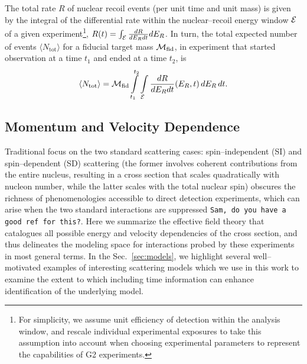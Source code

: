 \documentclass[11pt]{article}
\newcommand{\beq}{\begin{equation}} \newcommand{\eeq}{\end{equation}}
\newcommand{\Sec}[1]{Sec.~\ref{#1}} \newcommand{\Secs}[2]{Secs.~\ref{#1} and \ref{#2}} \newcommand{\Secm}[2]{Secs.~\ref{#1} through \ref{#2}}
\newcommand{\sjwColor}{red}
\newcommand{\sjwtt}[1]{{\color{\sjwColor}\tt #1}}
\begin{document}
The total rate $R$ of nuclear recoil events (per unit time and unit mass) is given by the integral of the differential rate within the nuclear--recoil energy window ${\cal E}$ of a given experiment\footnote{For simplicity, we assume unit efficiency of detection within the analysis window, and rescale individual experimental exposures to take this assumption into account when choosing experimental parameters to represent the capabilities of G2 experiments.}, $R(t)=\int_{\cal E} \frac{dR}{dE_R dt} dE_R$. In turn, the total expected number of events $\langle N_\mathrm{tot}\rangle$ for a fiducial target mass ${\cal M}_\textrm{fid}$, in experiment that started observation at a time $t_1$ and ended at a time $t_2$, is
\beq \label{eq:totevents}
\langle N_\mathrm{tot}\rangle =  \cM_\textrm{fid} \int\limits_{t_1}^{t_2} \int\limits_\cE  \frac{dR}{dE_R dt}(E_R,t)\,dE_R \,dt.
\eeq


\subsection{Momentum and Velocity Dependence}
\label{subsec:momentum_velocity}

Traditional focus on the two standard scattering cases: spin--independent (SI) and spin--dependent (SD) scattering (the former involves coherent contributions from the entire nucleus, resulting in a cross section that scales quadratically with nucleon number, while the latter scales with the total nuclear spin) obscures the richness of phenomenologies accessible to direct detection experiments, which can arise when the two standard interactions are suppressed \cite{} \sjwtt{Sam, do you have a good ref for this?}. Here we summarize the effective field theory that catalogues all possible energy and velocity dependencies of the cross section, and thus delineates the modeling space for interactions probed by these experiments in most general terms. In the \Sec{sec:models}, we highlight several well--motivated examples of interesting scattering models which we use in this work to examine the extent to which including time information can enhance identification of the underlying model.

\end{document}
